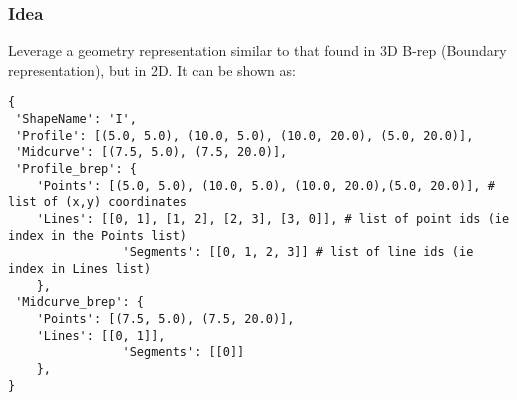 \begin{frame}[fragile]\frametitle{Idea}

Leverage a geometry representation similar to that found in 3D B-rep (Boundary representation), but in 2D. It can be shown as:

\begin{lstlisting}
{
 'ShapeName': 'I',
 'Profile': [(5.0, 5.0), (10.0, 5.0), (10.0, 20.0), (5.0, 20.0)],
 'Midcurve': [(7.5, 5.0), (7.5, 20.0)],
 'Profile_brep': {
    'Points': [(5.0, 5.0), (10.0, 5.0), (10.0, 20.0),(5.0, 20.0)], # list of (x,y) coordinates
    'Lines': [[0, 1], [1, 2], [2, 3], [3, 0]], # list of point ids (ie index in the Points list)
                'Segments': [[0, 1, 2, 3]] # list of line ids (ie index in Lines list)
    },
 'Midcurve_brep': {
    'Points': [(7.5, 5.0), (7.5, 20.0)],
    'Lines': [[0, 1]],
                'Segments': [[0]]
    },    
}
\end{lstlisting}	
\end{frame}